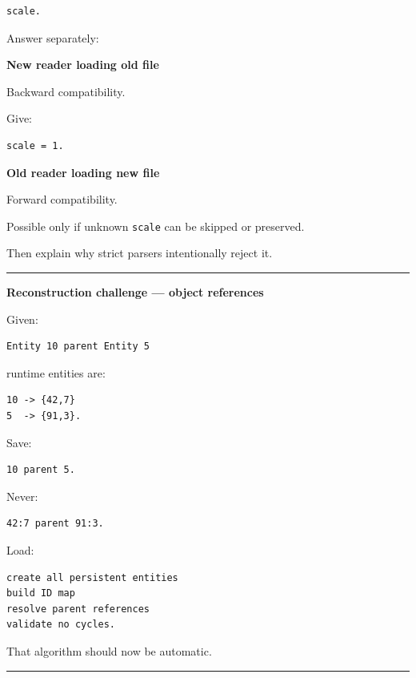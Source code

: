 \begin{verbatim}
scale.
\end{verbatim}

Answer separately:

\textbf{New reader loading old file}

Backward compatibility.

Give:

\begin{verbatim}
scale = 1.
\end{verbatim}

\textbf{Old reader loading new file}

Forward compatibility.

Possible only if unknown \texttt{scale} can be skipped or preserved.

Then explain why strict parsers intentionally reject it.

\begin{center}\rule{0.5\linewidth}{0.5pt}\end{center}

\textbf{Reconstruction challenge --- object references}

Given:

\begin{verbatim}
Entity 10 parent Entity 5
\end{verbatim}

runtime entities are:

\begin{verbatim}
10 -> {42,7}
5  -> {91,3}.
\end{verbatim}

Save:

\begin{verbatim}
10 parent 5.
\end{verbatim}

Never:

\begin{verbatim}
42:7 parent 91:3.
\end{verbatim}

Load:

\begin{verbatim}
create all persistent entities
build ID map
resolve parent references
validate no cycles.
\end{verbatim}

That algorithm should now be automatic.

\begin{center}\rule{0.5\linewidth}{0.5pt}\end{center}

